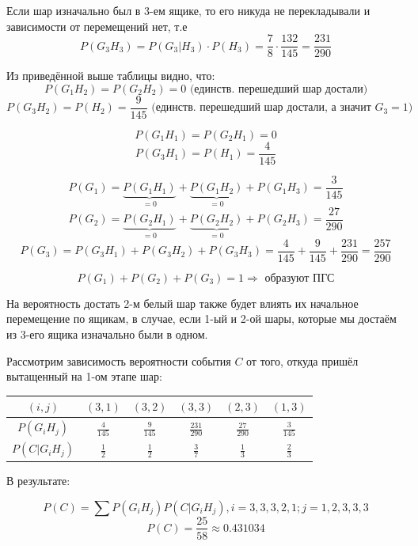 \begin{enumerate}
	Если шар изначально был в 3-ем ящике, то его никуда не перекладывали и зависимости от перемещений нет, т.е
	\[ P(G_3H_3) = P(G_3|H_3) \cdot P(H_3) = \dfrac{7}{8} \cdot \dfrac{132}{145} = \dfrac{231}{290} \]
	
	Из приведённой выше таблицы видно, что:
	\[ P(G_1H_2) = P(G_2H_2) = 0 \text{ (единств. перешедший шар достали)}\]
	\[ P(G_3H_2) = P(H_2) = \dfrac{9}{145} \text{ (единств. перешедший шар достали, а значит } G_3 = 1 \text{)} \]
	
	\[ P(G_1H_1) = P(G_2H_1) = 0 \]
	\[ P(G_3H_1) = P(H_1) = \dfrac{4}{145} \]
	
	\[ P(G_1) = \underbrace{P(G_1H_1)}_{=0} + \underbrace{P(G_1H_2)}_{=0} + P(G_1H_3) = \dfrac{3}{145} \]
	\[ P(G_2) = \underbrace{P(G_2H_1)}_{=0} + \underbrace{P(G_2H_2)}_{=0} + P(G_2H_3) = \dfrac{27}{290} \]
	\[ P(G_3) = P(G_3H_1) + P(G_3H_2) + P(G_3H_3) = \dfrac{4}{145} + \dfrac{9}{145} + \dfrac{231}{290} = \dfrac{257}{290} \]
	
	\[ P(G_1) + P(G_2) + P(G_3) = 1 \Rightarrow \text{ образуют ПГС} \]
	
	На вероятность достать 2-м белый шар также будет влиять их начальное перемещение по ящикам, в случае, если 1-ый и 2-ой шары, которые мы достаём из 3-его ящика изначально были в одном.
	
	Рассмотрим зависимость вероятности события $C$ от того, откуда пришёл вытащенный на 1-ом этапе шар:
	
	\begin{table}[h]
		\centering\makegapedcells
		\begin{tabular}{|c|c|c|c|c|c|}
			\hline
			$(i,j)$       & $(3,1)$         & $(3,2)$         & $(3,3)$           & $(2,3)$          & $(1,3)$         \\ \hline
			$P(G_iH_j)$   & $\frac{4}{145}$ & $\frac{9}{145}$ & $\frac{231}{290}$ & $\frac{27}{290}$ & $\frac{3}{145}$ \\ \hline
			$P(C|G_iH_j)$ & $\frac{1}{2}$   & $\frac{1}{2}$   & $\frac{3}{7}$     & $\frac{1}{3}$    & $\frac{2}{3}$   \\ \hline
		\end{tabular}
	\end{table}

	В результате:
	
	\[ P(C) = \sum P(G_iH_j) P(C|G_iH_j), i=3,3,3,2,1; j=1,2,3,3,3 \]
	\[ P(C) = \dfrac{25}{58} \approx 0.431034 \]
	
\end{enumerate}

 